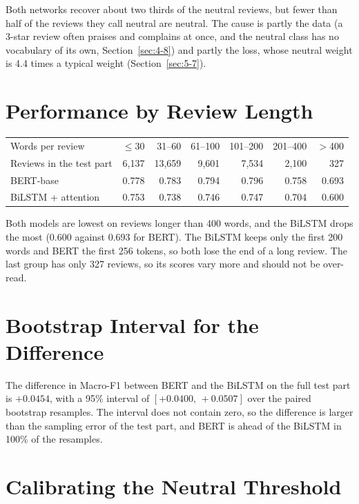 Both networks recover about two thirds of the neutral reviews, but fewer than half of the reviews they call neutral are neutral. The cause is partly the data (a 3-star review often praises and complains at once, and the neutral class has no vocabulary of its own, Section~\ref{sec:4-8}) and partly the loss, whose neutral weight is 4.4 times a typical weight (Section~\ref{sec:5-7}).

\section{Performance by Review Length}
\label{sec:7-5}

\begin{center}
\small
\begin{tabular}{@{}lrrrrrr@{}}
    \toprule
    Words per review & $\le$30 & 31--60 & 61--100 & 101--200 & 201--400 & $>$400 \\
    Reviews in the test part & 6{,}137 & 13{,}659 & 9{,}601 & 7{,}534 & 2{,}100 & 327 \\
    \midrule
    BERT-base & 0.778 & 0.783 & 0.794 & 0.796 & 0.758 & 0.693 \\
    BiLSTM + attention & 0.753 & 0.738 & 0.746 & 0.747 & 0.704 & 0.600 \\
    \bottomrule
\end{tabular}
\end{center}

Both models are lowest on reviews longer than 400 words, and the BiLSTM drops the most (0.600 against 0.693 for BERT). The BiLSTM keeps only the first 200 words and BERT the first 256 tokens, so both lose the end of a long review. The last group has only 327 reviews, so its scores vary more and should not be over-read.

\section{Bootstrap Interval for the Difference}
\label{sec:7-6}

The difference in Macro-F1 between BERT and the BiLSTM on the full test part is $+0.0454$, with a 95\% interval of $[+0.0400,\,+0.0507]$ over the paired bootstrap resamples. The interval does not contain zero, so the difference is larger than the sampling error of the test part, and BERT is ahead of the BiLSTM in 100\% of the resamples.

\section{Calibrating the Neutral Threshold}
\label{sec:7-7}


